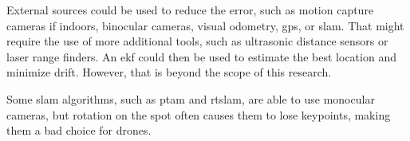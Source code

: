   External sources could be used to reduce the error, such as motion capture cameras if indoors, binocular cameras, visual odometry, \gls{gps}, or \gls{slam}.
  That might require the use of more additional tools, such as ultrasonic distance sensors or laser range finders.
  An \gls{ekf} could then be used to estimate the best location and minimize drift.
  However, that is beyond the scope of this research.

  Some \gls{slam} algorithms, such as \gls{ptam} and \gls{rtslam}, are able to use monocular cameras, but rotation on the spot often causes them to lose keypoints, making them a bad choice for drones.

% 

